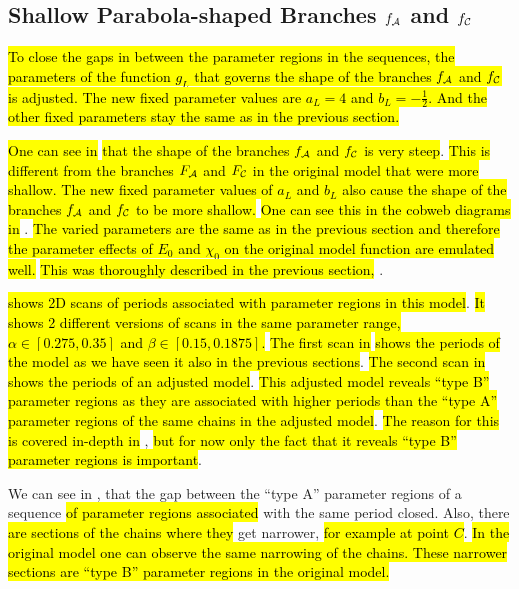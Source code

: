\subsection{Shallow Parabola-shaped Branches $f_{\mathcal{A}}$ and $f_{\mathcal{C}}$}
\label{sec:setup.quad.hyper.2}

\hl{
	To close the gaps in between the parameter regions in the sequences, the parameters of the function $g_L$ that governs the shape of the branches $f_{\mathcal{A}}$ and $f_{\mathcal{C}}$ is adjusted.
	The new fixed parameter values are $a_L = 4$ and $b_L = -\frac{1}{2}$.
	And the other fixed parameters stay the same as in the previous section.
}

\hl{One can see in}  \hl{that the shape of the branches $f_{\mathcal{A}}$ and $f_{\mathcal{C}}$ is very steep}.
\hl{
	This is different from the branches $F_{\mathcal{A}}$ and $F_{\mathcal{C}}$ in the original model that were more shallow.
	The new fixed parameter values of $a_L$ and $b_L$ also cause the shape of the branches $f_{\mathcal{A}}$ and $f_{\mathcal{C}}$ to be more shallow.
}
\hl{One can see this in the cobweb diagrams in} .
\hl{
	The varied parameters are the same as in the previous section and therefore the parameter effects of $E_0$ and $\chi_0$ on the original model function are emulated well.
}
\hl{This was thoroughly described in the previous section,} .

 \hl{shows 2D scans of periods associated with parameter regions in this model}.
\hl{
	It shows 2 different versions of scans in the same parameter range, $\alpha \in [0.275, 0.35]$ and $\beta \in [0.15, 0.1875]$.
}
\hl{The first scan in}  \hl{shows the periods of the model as we have seen it also in the previous sections}.
\hl{The second scan in}  \hl{shows the periods of an adjusted model}.
\hl{This adjusted model reveals ``type B'' parameter regions as they are associated with higher periods than the ``type A'' parameter regions of the same chains in the adjusted model}.
\hl{The reason for this is covered in-depth in} , \hl{but for now only the fact that it reveals ``type B'' parameter regions is important}.

We can see in , that the gap between the ``type A'' parameter regions of a sequence \hl{of parameter regions associated} with the same period closed.
Also, there \hl{are sections of the chains where they} get narrower, \hl{for example at point $C$}.
\hl{
	In the original model one can observe the same narrowing of the chains.
	These narrower sections are ``type B'' parameter regions in the original model.
}


